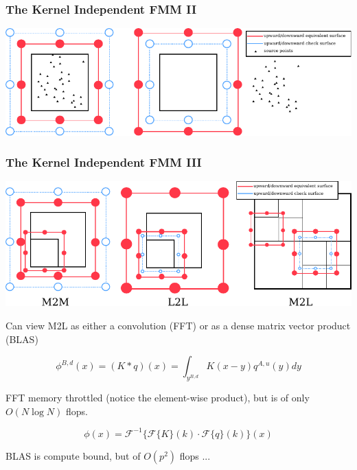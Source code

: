 \begin{frame}
    \frametitle{The Kernel Independent FMM II}
    \includegraphics[width=\linewidth]{assets/p2m.pdf}
\end{frame}

\begin{frame}
    \frametitle{The Kernel Independent FMM III}
    \includegraphics[width=\linewidth]{assets/translations.pdf}
\end{frame}

\begin{frame}

    Can view M2L as either a convolution (FFT) or as a dense matrix vector product (BLAS)

    \begin{equation}
        \phi^{B, d}(x) = (K \ast q)(x) = \int_{y^{B, d}} K(x-y)q^{A, u}(y)dy
        \label{eq::sec:m2l:sub:formulation:m2l_convolution}
    \end{equation}

    FFT memory throttled (notice the element-wise product), but is of only $O(N \log N)$ flops.

    \begin{equation}
        \phi(x) = \mathcal{F}^{-1}\{ \mathcal{F}\{K\}(k) \cdot \mathcal{F}\{q\}(k)  \} (x)
        \label{eq::sec:m2l:sub:formulation:m2l_convolution_matrix_2}
    \end{equation}

    BLAS is compute bound, but of $O(p^2)$ flops ...

\end{frame}

